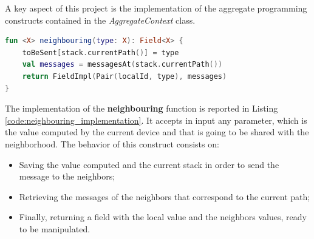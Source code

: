 A key aspect of this project is the implementation of the aggregate programming constructs contained in the \textit{AggregateContext} class.
\begin{lstlisting}[caption={Neighbouring implementation}, captionpos=b, language=Kotlin, label={code:neighbouring_implementation}]
fun <X> neighbouring(type: X): Field<X> {
    toBeSent[stack.currentPath()] = type
    val messages = messagesAt(stack.currentPath())
    return FieldImpl(Pair(localId, type), messages)
}
\end{lstlisting}
The implementation of the \textbf{neighbouring} function is reported in Listing \ref{code:neighbouring_implementation}. It accepts in input any parameter, which is the value computed by the current device and that is going to be shared with the neighborhood.\newline 
The behavior of this construct consists on:
\begin{itemize}
    \item Saving the value computed and the current stack in order to send the message to the neighbors;
    \item Retrieving the messages of the neighbors that correspond to the current path;
    \item Finally, returning a field with the local value and the neighbors values, ready to be manipulated.
\end{itemize}

